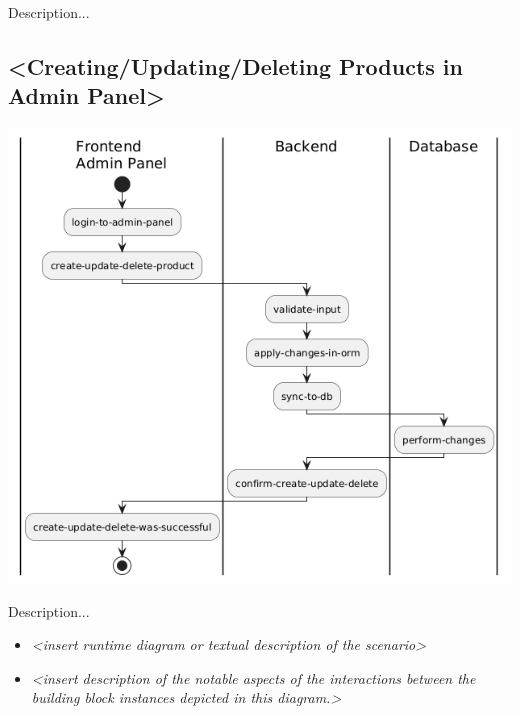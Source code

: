 Description...

\hypertarget{__runtime_scenario_3}{%
\subsection{\textless Creating/Updating/Deleting Products in Admin Panel\textgreater{}}\label{__runtime_scenario_3}}
\includegraphics{images/uml_swimlane_product_create_update_delete.png}

Description...

\begin{itemize}
\item
  \emph{\textless insert runtime diagram or textual description of the
  scenario\textgreater{}}
\item
  \emph{\textless insert description of the notable aspects of the
  interactions between the building block instances depicted in this
  diagram.\textgreater{}}
\end{itemize}